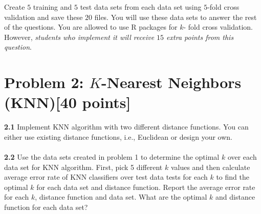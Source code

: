 \documentclass{article}
\begin{document}
Create $5$ training and $5$ test data sets from each data set using  $5$-fold cross validation and save these $20$ files. You will use these data sets to answer the rest of the questions. You are allowed to use R packages for $k$- fold cross validation. However,\textit{ students who implement it will receive $15$ extra points from this question}.

\section*{Problem 2: $K$-Nearest Neighbors (KNN)[40 points]} 

\textbf{2.1}  Implement KNN algorithm with two different distance functions. You can either use existing distance functions, i.e., Euclidean  or design your own.
\\
\\
\textbf{2.2}  Use the data sets created in problem 1 to determine the optimal $k$  over each data set for KNN algorithm. First, pick 5  different $k$ values and then calculate average error rate of  KNN classifiers over test data tests  for each $k$ to find the optimal $k$ for each data set and distance function. Report the average error rate for each $k$, distance function and data set.  What are the optimal $k$ and distance function for each data set?
\\
\\
\end{document}
